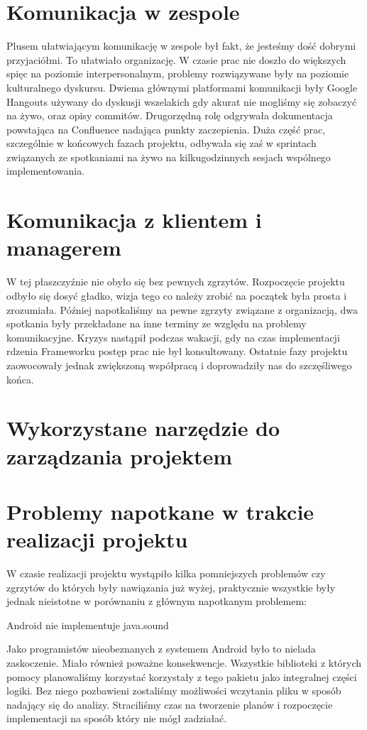 \section{Komunikacja w zespole}
Plusem ułatwiającym komunikację w zespole był fakt, że jesteśmy dość dobrymi przyjaciółmi. To ułatwiało organizację. W czasie prac nie doszło do większych spięc na poziomie interpersonalnym, problemy rozwiązywane były na poziomie kulturalnego dyskursu. Dwiema głównymi platformami komunikacji były Google Hangouts używany do dyskusji wszelakich gdy akurat nie mogliśmy się zobaczyć na żywo, oraz opisy commitów. Drugorzędną rolę odgrywała dokumentacja powstająca na Confluence nadająca punkty zaczepienia. Duża część prac, szczególnie w końcowych fazach projektu, odbywała się zaś w sprintach związanych ze spotkaniami na żywo na kilkugodzinnych sesjach wspólnego implementowania.
\section{Komunikacja z klientem i managerem}
W tej płaszczyźnie nie obyło się bez pewnych zgrzytów. Rozpoczęcie projektu odbyło się dosyć gładko, wizja tego co należy zrobić na początek była prosta i zrozumiała. Później napotkaliśmy na pewne zgrzyty związane z organizacją, dwa spotkania były przekładane na inne terminy ze względu na problemy komunikacyjne. Kryzys nastąpił podczas wakacji, gdy na czas implementacji rdzenia Frameworku postęp prac nie był konsultowany. Ostatnie fazy projektu zaowocowały jednak zwiększoną współpracą i doprowadziły nas do szczęśliwego końca.
\section{Wykorzystane narzędzie do zarządzania projektem}
\section{Problemy napotkane w trakcie realizacji projektu}
\label{problem}
W czasie realizacji projektu wystąpiło kilka pomniejszych problemów czy zgrzytów do których były nawiązania już wyżej, praktycznie wszystkie były jednak nieistotne w porównaniu z głównym napotkanym problemem:

Android nie implementuje java.sound

Jako programistów nieobeznanych z systemem Android było to nielada zaskoczenie. Miało również poważne konsekwencje. Wszystkie biblioteki z których pomocy planowaliśmy korzystać korzystały z tego pakietu jako integralnej części logiki. Bez niego pozbawieni zostaliśmy możliwości wczytania pliku w sposób nadający się do analizy. Straciliśmy czas na tworzenie planów i rozpoczęcie implementacji na sposób który nie mógł zadziałać.

